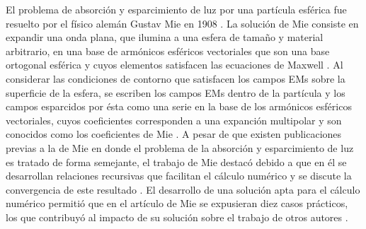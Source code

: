 El problema de absorción y esparcimiento de luz por una partícula esférica fue resuelto por el físico alemán Gustav Mie en 1908 \cite{mie1908metallosung}.  La solución de Mie consiste en expandir una onda plana, que ilumina a una esfera de tamaño y material arbitrario, en una base de armónicos esféricos vectoriales que son una base ortogonal esférica y cuyos elementos satisfacen las ecuaciones de Maxwell \cite{bohren1998absorption}. Al considerar las condiciones de contorno que satisfacen los campos EMs sobre la superficie de la esfera,  se escriben los campos EMs dentro de la partícula y los campos esparcidos por ésta como una serie en la base de los armónicos esféricos vectoriales, cuyos coeficientes corresponden a una expanción multipolar y son conocidos como los coeficientes de Mie \cite{bohren1998absorption}. A pesar de que existen publicaciones previas a la de Mie en donde  el problema de la absorción y esparcimiento de luz es tratado de forma semejante, el trabajo de Mie destacó debido a que en él se  desarrollan relaciones recursivas que facilitan el cálculo numérico y se discute la convergencia de este resultado \cite{horvath2009historic}. El desarrollo de una solución apta para el cálculo numérico permitió que en el artículo de Mie se expusieran diez casos prácticos, los que contribuyó al impacto de su solución sobre el trabajo de otros autores \cite{horvath2009historic}. 

